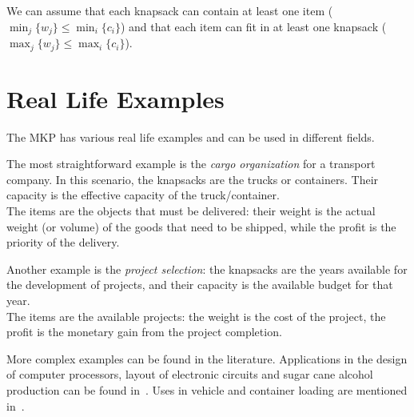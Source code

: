 We can assume that each knapsack can contain at least one item
(\(\min_{j}\{w_{j}\} \leq \min_{i}\{c_{i}\}\))
and that each item can fit in at least one knapsack
(\(\max_{j}\{w_{j}\} \leq \max_{i}\{c_{i}\}\)).


\section{Real Life Examples}
The MKP has various real life examples and can be used in different fields.

The most straightforward example is the \textit{cargo organization} for a transport company.
In this scenario, the knapsacks are the trucks or containers.
Their capacity is the effective capacity of the truck/container.\\
The items are the objects that must be delivered:
their weight is the actual weight (or volume) of the goods that need to be shipped,
while the profit is the priority of the delivery.

Another example is the \textit{project selection}: the knapsacks are
the years available for the development of projects,
and their capacity is the available budget for that year.\\
The items are the available projects: the weight is the cost of the project,
the profit is the monetary gain from the project completion.

More complex examples can be found in the literature.
Applications in the design of computer processors, layout of electronic
circuits and sugar cane alcohol production can be found in~\cite{example:1996}.
Uses in vehicle and container loading are mentioned in~\cite{example:1971}.